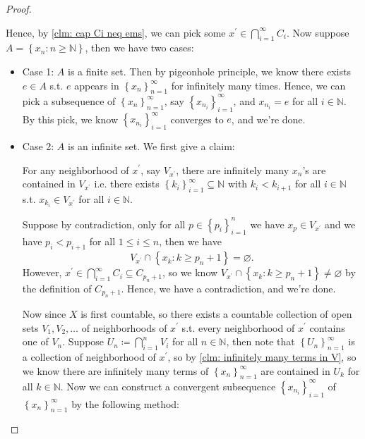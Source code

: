 \begin{proof}
\begin{explanation}
  \end{explanation}
  Hence, by \autoref{clm: cap Ci neq ems}, we can pick some \(x^{\prime} \in \bigcap_{i=1}^{\infty} C_i \). Now suppose \(A = \left\{ x_n: n \ge \mathbb{N}  \right\} \), then we have two cases: 
  \begin{itemize}
    \item Case 1: \(A\) is a finite set. Then by pigeonhole principle, we know there exists \(e \in A\) s.t. \(e\) appears in \(\left\{ x_n \right\}_{n=1}^{\infty}  \) for infinitely many times. Hence, we can pick a subsequence of \(\left\{ x_n \right\}_{n=1}^{\infty}  \), say \(\left\{ x_{n_i} \right\}_{i=1}^{\infty}  \), and \(x_{n_i} = e\) for all \(i \in \mathbb{N} \). By this pick, we know \(\left\{ x_{n_i} \right\}_{i=1}^{\infty}  \) converges to \(e\), and we're done.          
    \item Case 2: \(A\) is an infinite set. We first give a claim:
    \begin{claim} \label{clm: infinitely many terms in V}
      For any neighborhood of \(x^{\prime} \), say \(V_{x^{\prime} }\), there are infinitely many \(x_n\)'s are contained in \(V_{x^{\prime} }\) i.e. there exists \(\left\{ k_i \right\}_{i=1}^{\infty} \subseteq \mathbb{N}  \) with \(k_i < k_{i+1}\) for all \(i \in \mathbb{N} \) s.t. \(x_{k_i} \in V_{x^{\prime} }\) for all \(i \in \mathbb{N} \).        
    \end{claim}
    \begin{explanation}
      Suppose by contradiction, only for all \(p \in \left\{ p_i \right\}_{i=1}^{n}  \) we have \(x_p \in V_{x^{\prime} }\) and we have \(p_i < p_{i+1}\) for all \(1 \le i \le n\), then we have 
      \[
        V_{x^{\prime} } \cap \left\{ x_k: k \ge p_n + 1 \right\} = \varnothing. 
      \] 
      However, \(x^{\prime} \in \bigcap_{i=1}^{\infty} C_i \subseteq C_{p_n + 1} \), so we know \(V_{x^{\prime} } \cap \left\{ x_k: k \ge p_n + 1 \right\} \neq \varnothing \) by the definition of \(C_{p_n + 1}\). Hence, we have a contradiction, and we're done.      
    \end{explanation}
    Now since \(X\) is first countable, so there exists a countable collection of open sets \(V_1, V_2, \dots \) of neighborhoods of \(x^{\prime} \) s.t. every neighborhood of \(x^{\prime} \) contains one of \(V_n\). Suppose \(U_n \coloneqq \bigcap_{i=1}^{n} V_i \) for all \(n \in \mathbb{N} \), then note that \(\left\{ U_n \right\}_{n=1}^{\infty}  \) is a collection of neighborhood of \(x^{\prime} \), so by \autoref{clm: infinitely many terms in V}, so we know there are infinitely many terms of \(\left\{ x_n \right\}_{n=1}^{\infty}  \) are contained in \(U_k\) for all \(k \in \mathbb{N} \). Now we can construct a convergent subsequence \(\left\{ x_{n_i} \right\}_{i=1}^{\infty}  \) of \(\left\{ x_n \right\}_{n=1}^{\infty}  \) by the following method:

\end{itemize}
\end{proof}

